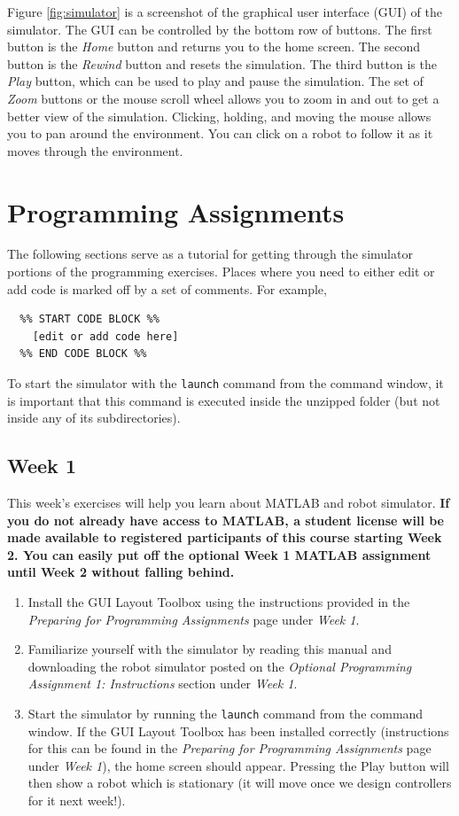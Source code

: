 \documentclass[10pt]{article}
\begin{document}
Figure \ref{fig:simulator} is a screenshot of the graphical user interface (GUI) of the simulator. The GUI can be controlled by the bottom row of buttons. The first button is the \textit{Home} button and returns you to the home screen. The second button is the \textit{Rewind} button and resets the simulation. The third button is the \textit{Play} button, which can be used to play and pause the simulation. The set of \textit{Zoom} buttons or the mouse scroll wheel allows you to zoom in and out to get a better view of the simulation. Clicking, holding, and moving the mouse allows you to pan around the environment. You can click on a robot to follow it as it moves through the environment.

\newpage
\section{Programming Assignments}

The following sections serve as a tutorial for getting through the simulator portions of the programming exercises. Places where you need to either edit or add code is marked off by a set of comments. For example,

\begin{verbatim}
  %% START CODE BLOCK %%
    [edit or add code here]
  %% END CODE BLOCK %%
\end{verbatim}

To start the simulator with the \texttt{launch} command from the command window, it is important that this command is executed inside the unzipped folder (but not inside any of its subdirectories).

\subsection{Week 1}

This week's exercises will help you learn about MATLAB and robot simulator. \textbf{If you do not already have access to MATLAB, a student license will be made available to registered participants of this course starting Week 2. You can easily put off the optional Week 1 MATLAB assignment until Week 2 without falling behind.} 

\begin{enumerate}
\item Install the GUI Layout Toolbox using the instructions provided in the \emph{Preparing for Programming Assignments} page under \emph{Week 1}. 
\item Familiarize yourself with the simulator by reading this manual and downloading the robot simulator posted on the \textit{Optional Programming Assignment 1: Instructions} section under \emph{Week 1}.
\item Start the simulator by running the \texttt{launch} command from the command window. If the GUI Layout Toolbox has been installed correctly (instructions for this can be found in the \emph{Preparing for Programming Assignments} page under \emph{Week 1}), the home screen should appear. Pressing the Play button will then show a robot which is stationary (it will move once we design controllers for it next week!). 
\end{enumerate}
\end{document}
